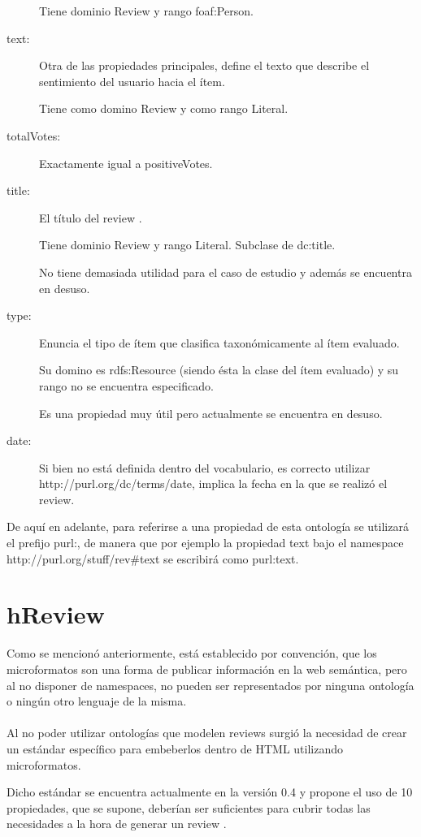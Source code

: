 \begin{description}
  Tiene dominio Review y rango foaf:Person. 
  \item [text:] Otra de las propiedades principales, define el texto que describe el sentimiento del usuario hacia el ítem. 
  
  Tiene como domino Review y como rango Literal.
  \item [totalVotes:] Exactamente igual a positiveVotes.
  \item [title:] El título del review . 
  
  Tiene dominio Review y rango Literal. Subclase de dc:title. 
  
  No tiene demasiada utilidad para el caso de estudio y además se encuentra en desuso.
  \item [type:] Enuncia el tipo de ítem que clasifica taxonómicamente al ítem evaluado. 
  
  Su domino es rdfs:Resource (siendo ésta la clase del ítem evaluado) y su rango no se encuentra especificado. 
  
  Es una propiedad muy útil pero actualmente se encuentra en desuso.
  \item [date:] Si bien no está definida dentro del vocabulario, es correcto utilizar \\\noindent http://purl.org/dc/terms/date, implica la fecha
  en la que se realizó el review.
\end{description}

De aquí en adelante, para referirse a una propiedad de esta ontología se utilizará el prefijo purl:, de manera que por ejemplo
la propiedad text bajo el namespace http://purl.org/stuff/rev\#text se escribirá como purl:text.

\section{hReview}
\label{section:hreview}

Como se mencionó anteriormente, está establecido por convención, que los microformatos son una forma de publicar información en la 
web semántica, pero al no disponer de namespaces, no pueden ser representados por ninguna ontología o ningún otro lenguaje de la misma. 
\\\\
Al no poder utilizar ontologías que modelen reviews surgió la necesidad de crear un estándar específico para embeberlos dentro de HTML 
utilizando microformatos.

Dicho estándar se encuentra actualmente en la versión 0.4 \cite{Celik} y propone el uso de 10 propiedades, que se supone, deberían ser 
suficientes para cubrir todas las necesidades a la hora de generar un review .

